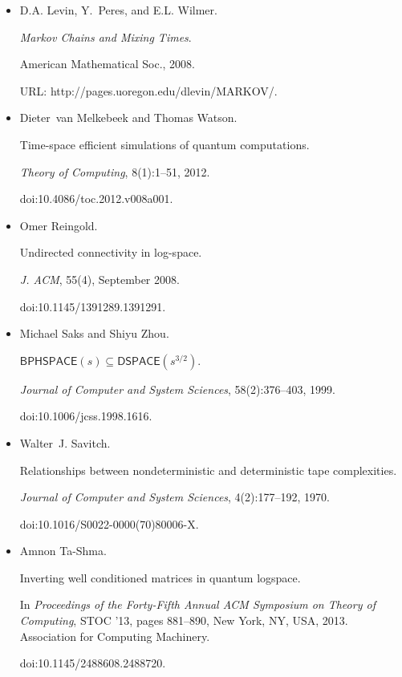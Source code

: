 \documentclass[10pt,a4paper]{article}
\begin{document}
\begin{itemize}
\item[] 
[19]

D.A. Levin, Y. Peres, and E.L. Wilmer.


\emph{Markov Chains and Mixing Times}.


American Mathematical Soc., 2008.


URL: http://pages.uoregon.edu/dlevin/MARKOV/.





\item[] 
[20]

Dieter van Melkebeek and Thomas Watson.


Time-space efficient simulations of quantum computations.


\emph{Theory of Computing}, 8(1):1–51, 2012.


doi:10.4086/toc.2012.v008a001.





\item[] 
[21]

Omer Reingold.


Undirected connectivity in log-space.


\emph{J. ACM}, 55(4), September 2008.


doi:10.1145/1391289.1391291.





\item[] 
[22]

Michael Saks and Shiyu Zhou.


$\mathsf{BPHSPACE}(s)\subseteq\mathsf{DSPACE}(s^{3/2})$.


\emph{Journal of Computer and System Sciences}, 58(2):376–403, 1999.


doi:10.1006/jcss.1998.1616.





\item[] 
[23]

Walter J. Savitch.


Relationships between nondeterministic and deterministic tape
complexities.


\emph{Journal of Computer and System Sciences}, 4(2):177–192, 1970.


doi:10.1016/S0022-0000(70)80006-X.





\item[] 
[24]

Amnon Ta-Shma.


Inverting well conditioned matrices in quantum logspace.


In \emph{Proceedings of the Forty-Fifth Annual ACM Symposium on Theory
of Computing}, STOC ’13, pages 881–890, New York, NY, USA, 2013. Association
for Computing Machinery.


doi:10.1145/2488608.2488720.





\end{itemize}
\end{document}
